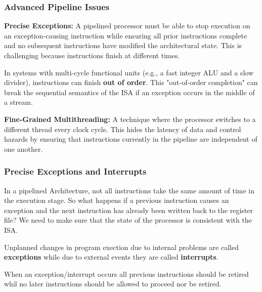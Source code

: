 \subsubsection{Advanced Pipeline Issues}

\begin{important}
	\textbf{Precise Exceptions:} A pipelined processor must be able to stop execution on an exception-causing instruction while ensuring all prior instructions complete and no subsequent instructions have modified the architectural state. This is challenging because instructions finish at different times.
\end{important}

\begin{lemma}
	In systems with multi-cycle functional units (e.g., a fast integer ALU and a slow divider), instructions can finish \textbf{out of order}. This "out-of-order completion" can break the sequential semantics of the ISA if an exception occurs in the middle of a stream.
\end{lemma}

\begin{definition}
	\textbf{Fine-Grained Multithreading:} A technique where the processor switches to a different thread every clock cycle. This hides the latency of data and control hazards by ensuring that instructions currently in the pipeline are independent of one another.
\end{definition}


\subsubsection{Precise Exceptions and Interrupts}

In a pipelined Architecture, not all instructions take the same amount of time in the execution stage.
So what happens if a previous instruction causes an exception and the next instruction has already been written back to the register file?
We need to make sure that the state of the processor is consistent with the ISA.

\begin{definition}
	Unplanned changes in program exection due to internal problems are called \textbf{exceptions} while due to external events they are called \textbf{interrupts}.
\end{definition}

\begin{important}
	When an exception/interrupt occurs all previous instructions should be retired whil no later instructions should be allowed to proceed nor be retired.
\end{important}

